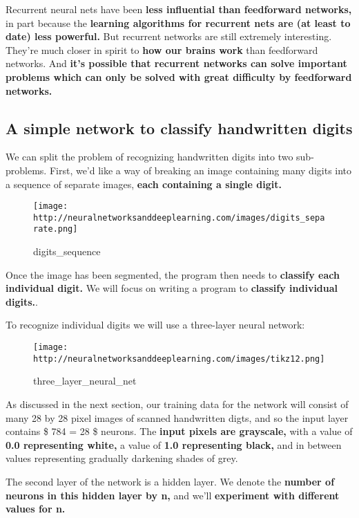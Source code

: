 \documentclass[]{article}
\begin{document}
Recurrent neural nets have been \textbf{less influential than
feedforward networks,} in part because the \textbf{learning algorithms
for recurrent nets are (at least to date) less powerful.} But recurrent
networks are still extremely interesting. They're much closer in spirit
to \textbf{how our brains work} than feedforward networks. And
\textbf{it's possible that recurrent networks can solve important
problems which can only be solved with great difficulty by feedforward
networks.}

\subsection{A simple network to classify handwritten
digits}\label{a-simple-network-to-classify-handwritten-digits}

We can split the problem of recognizing handwritten digits into two
sub-problems. First, we'd like a way of breaking an image containing
many digits into a sequence of separate images, \textbf{each containing
a single digit.}

\begin{figure}[htbp]
\centering
\texttt{[image: http://neuralnetworksanddeeplearning.com/images/digits\_separate.png]}
\caption{digits\_sequence}
\end{figure}

Once the image has been segmented, the program then needs to
\textbf{classify each individual digit.} We will focus on writing a
program to \textbf{classify individual digits.}.

To recognize individual digits we will use a three-layer neural network:

\begin{figure}[htbp]
\centering
\texttt{[image: http://neuralnetworksanddeeplearning.com/images/tikz12.png]}
\caption{three\_layer\_neural\_net}
\end{figure}

As discussed in the next section, our training data for the network will
consist of many 28 by 28 pixel images of scanned handwritten digts, and
so the input layer contains \$ 784 = 28  \$ neurons. The
\textbf{input pixels are grayscale,} with a value of \textbf{0.0
representing white,} a value of \textbf{1.0 representing black,} and in
between values representing gradually darkening shades of grey.

The second layer of the network is a hidden layer. We denote the
\textbf{number of neurons in this hidden layer by n,} and we'll
\textbf{experiment with different values for n.}
\end{document}
